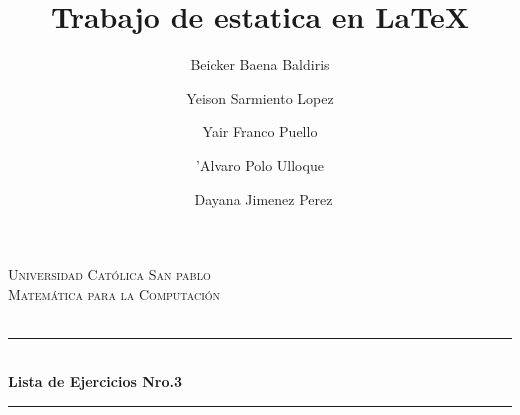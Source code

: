 \documentclass[12pt]{article}
\begin{document}
 
 

\title{Trabajo de estatica en \LaTeX}

\author{Beicker Baena Baldiris \and Yeison Sarmiento Lopez \and Yair Franco Puello \and 'Alvaro Polo Ulloque\and\ Dayana Jimenez Perez} 

\begin{titlepage}

\newcommand{\HRule}{\rule{\linewidth}{0.5mm}} %

\center %
 

\textsc{\LARGE Universidad Cat\'olica San pablo}\\[1.5cm] %
\textsc{\Large Matem\'atica para la Computaci\'on}\\[0.5cm] %
\textsc{\large }\\[0.5cm] %


\HRule \\[0.4cm]
{ \huge \bfseries Lista de Ejercicios Nro.3 }\\[0.4cm] %
\HRule \\[1.5cm]
 


\end{titlepage}
\end{document}
